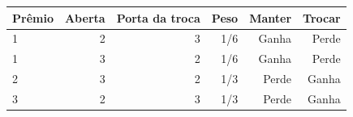 \begin{tabular}{lrrrrr}
\toprule
Prêmio & Aberta & Porta da troca & Peso & Manter & Trocar \\
\midrule
1 & 2 & 3 & 1/6 & Ganha & Perde \\
1 & 3 & 2 & 1/6 & Ganha & Perde \\
2 & 3 & 2 & 1/3 & Perde & Ganha \\
3 & 2 & 3 & 1/3 & Perde & Ganha \\
\bottomrule
\end{tabular}
